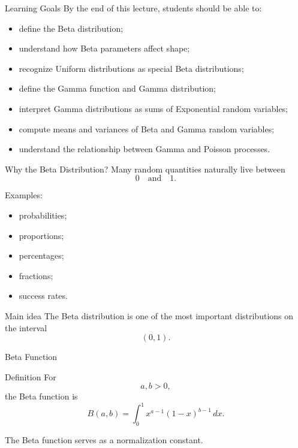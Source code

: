\setcounter{framenumber}{0}

\begin{frame}
  \titlepage
\end{frame}

\begin{frame}{Learning Goals}
By the end of this lecture, students should be able to:
\begin{itemize}
    \item define the Beta distribution;
    \item understand how Beta parameters affect shape;
    \item recognize Uniform distributions as special Beta distributions;
    \item define the Gamma function and Gamma distribution;
    \item interpret Gamma distributions as sums of Exponential random variables;
    \item compute means and variances of Beta and Gamma random variables;
    \item understand the relationship between Gamma and Poisson processes.
\end{itemize}
\end{frame}


\begin{frame}{Why the Beta Distribution?}
Many random quantities naturally live between
\[
0
\quad \text{and} \quad
1.
\]

Examples:
\begin{itemize}
    \item probabilities;
    \item proportions;
    \item percentages;
    \item fractions;
    \item success rates.
\end{itemize}

\vspace{0.25cm}

\begin{keybox}{Main idea}
The Beta distribution is one of the most important distributions on the interval
\[
(0,1).
\]
\end{keybox}
\end{frame}

\begin{frame}{Beta Function}
\begin{keybox}{Definition}
For
\[
a,b>0,
\]
the Beta function is
\[
{
B(a,b)
=
\int_0^1
x^{a-1}(1-x)^{b-1}\,dx.
}
\]
\end{keybox}

\vspace{0.25cm}

The Beta function serves as a normalization constant.
\end{frame}

